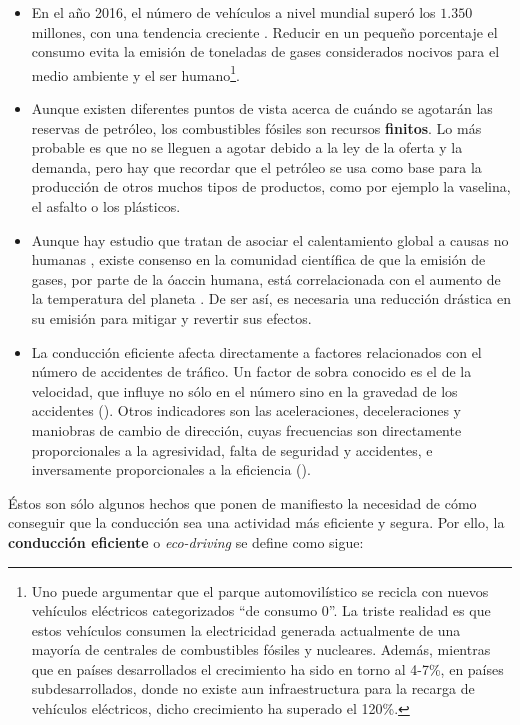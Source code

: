 \begin{itemize}
	\item En el año 2016, el número de vehículos a nivel mundial superó los $1.350$ millones, con una tendencia creciente \cite{oica2014motrate}. Reducir en un pequeño porcentaje el consumo evita la emisión de toneladas de gases considerados nocivos para el medio ambiente y el ser humano\footnote{
		Uno puede argumentar que el parque automovilístico se recicla con nuevos vehículos eléctricos categorizados \enquote{de consumo $0$}. La triste realidad es que estos vehículos consumen la electricidad generada actualmente de una mayoría de centrales de combustibles fósiles y nucleares. Además, mientras que en países desarrollados el crecimiento ha sido en torno al 4-7\%, en países subdesarrollados, donde no existe aun infraestructura para la recarga de vehículos eléctricos, dicho crecimiento ha superado el 120\%.
	}.
	\item Aunque existen diferentes puntos de vista acerca de cuándo se agotarán las reservas de petróleo, los combustibles fósiles son recursos \textbf{finitos}. Lo más probable es que no se lleguen a agotar debido a la ley de la oferta y la demanda, pero hay que recordar que el petróleo se usa como base para la producción de otros muchos tipos de productos, como por ejemplo la vaselina, el asfalto o los plásticos.
	\item Aunque hay estudio que tratan de asociar el calentamiento global a causas no humanas \cite{jaworowski2004solar}, existe consenso en la comunidad científica de que la emisión de gases, por parte de la óaccin humana, está correlacionada con el aumento de la temperatura del planeta \cite{oreskes2018scientific}. De ser así, es necesaria una reducción drástica en su emisión para mitigar y revertir sus efectos.
	\item La conducción eficiente afecta directamente a factores relacionados con el número de accidentes de tráfico. Un factor de sobra conocido es el de la velocidad, que influye no sólo en el número sino en la gravedad de los accidentes (\cite{imprialou2016re}). Otros indicadores son las aceleraciones, deceleraciones y maniobras de cambio de dirección, cuyas frecuencias son directamente proporcionales a la agresividad, falta de seguridad y accidentes, e inversamente proporcionales a la eficiencia (\cite{dingus2006100, lerner2010exploration}).
\end{itemize}

Éstos son sólo algunos hechos que ponen de manifiesto la necesidad de cómo conseguir que la conducción sea una actividad más eficiente y segura. Por ello, la \textbf{conducción eficiente} o \textit{eco-driving} se define como sigue:

